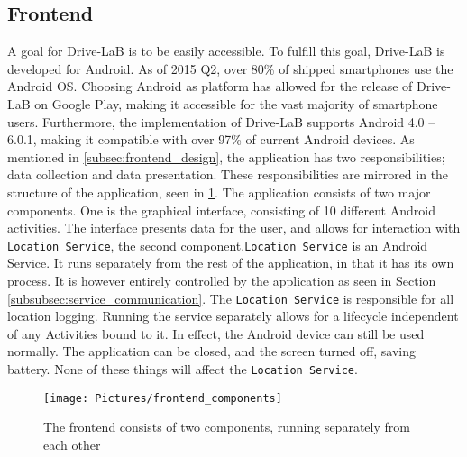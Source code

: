 \subsection{Frontend}\label{subsec:frontend_implementation}
A goal for Drive-LaB is to be easily accessible. To fulfill this goal, Drive-LaB is developed for Android. As of 2015 Q2, over 80\% of shipped smartphones use the Android OS\citep{smartphone_market_share}. Choosing Android as platform has allowed for the release of Drive-LaB on Google Play\citep{google_play_drivelab}, making it accessible for the vast majority of smartphone users. Furthermore, the implementation of Drive-LaB supports Android 4.0 – 6.0.1, making it compatible with over 97\% of current Android devices\citep{android_version_distribution}.
As mentioned in \ref{subsec:frontend_design}, the application has two responsibilities; data collection and data presentation. These responsibilities are mirrored in the structure of the application, seen in \ref{fig:frontend_components}. The application consists of two major components. One is the graphical interface, consisting of 10 different Android activities\citep{android_activity}. The interface presents data for the user, and allows for interaction with \texttt{Location Service}, the second component.\texttt{Location Service} is an Android Service\citep{android_service}. It runs separately from the rest of the application, in that it has its own process. It is however entirely controlled by the application as seen in Section \ref{subsubsec:service_communication}. The \texttt{Location Service} is responsible for all location logging. Running the service separately allows for a lifecycle independent of any Activities bound to it. In effect, the Android device can still be used normally. The application can be closed, and the screen turned off, saving battery. None of these things will affect the \texttt{Location Service}.

\begin{figure}[tb]
\centering
\texttt{[image: Pictures/frontend\_components]}
\caption{The frontend consists of two components, running separately from each other}
\label{fig:frontend_components}
\end{figure}

